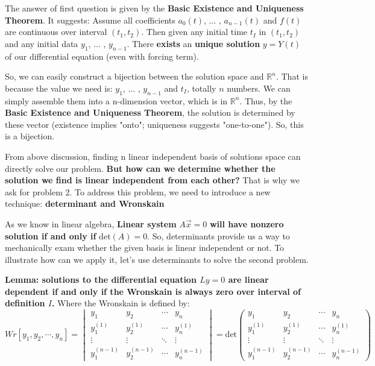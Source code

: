 \documentclass{article}
\begin{document}
The answer of first question is given by the \textbf{Basic Existence and Uniqueness Theorem}. It suggests: Assume all coefficients $a_{0}(t)$, ... , $a_{n-1}(t)$ and $f(t)$ are continuous over interval $(t_{1}, t_{2})$. Then given any initial time $t_{I}$ in $(t_{1}, t_{2})$ and any initial data $y_1$, ... , $y_{n-1}$. There \textbf{exists} an \textbf{unique solution} $y = Y(t)$ of our differential equation (even with forcing term).

So, we can easily construct a bijection between the solution space and $\mathbb{R}^{n}$. That is because the value we need is: $y_1$, ... , $y_{n-1}$ and $t_{I}$, totally $n$ numbers. We can simply assemble them into a n-dimension vector, which is in $\mathbb{R}^{n}$. Thus, by the \textbf{Basic Existence and Uniqueness Theorem}, the solution is determined by these vector (existence implies "onto"; uniqueness suggests "one-to-one"). So, this is a bijection.

From above discussion, finding n linear independent basis of solutions space can directly solve our problem. \textbf{But how can we determine whether the solution we find is linear independent from each other?} That is why we ask for problem 2. To address this problem, we need to introduce a new technique: \textbf{determinant and Wronskain}

As we know in linear algebra, \textbf{Linear system} $A\vec{x} = 0$ \textbf{will have nonzero solution if and only if} $\mathrm{det}(A) = 0$. So, determinants provide us a way to mechanically exam whether the given basis is linear independent or not. To illustrate how can we apply it, let's use determinants to solve the second problem.

\textbf{Lemma: solutions to the differential equation $Ly = 0$ are linear dependent if and only if the Wronskain is always zero over interval of definition $I$.} Where the Wronskain is defined by:
$$
Wr[y_{1}, y_{2}, \cdots, y_{n}] = 
\begin{vmatrix}
y_{1} & y_{2} & \cdots & y_{n} \\
y_{1}^{(1)} & y_{2}^{(1)} & \cdots & y_{n}^{(1)} \\
\vdots & \vdots & \ddots & \vdots \\
y_{1}^{(n-1)} & y_{2}^{(n-1)} & \cdots & y_{n}^{(n-1)}
\end{vmatrix} = \mathrm{det} \begin{pmatrix}
y_{1} & y_{2} & \cdots & y_{n} \\
y_{1}^{(1)} & y_{2}^{(1)} & \cdots & y_{n}^{(1)} \\
\vdots & \vdots & \ddots & \vdots \\
y_{1}^{(n-1)} & y_{2}^{(n-1)} & \cdots & y_{n}^{(n-1)}
\end{pmatrix}
$$
\end{document}
